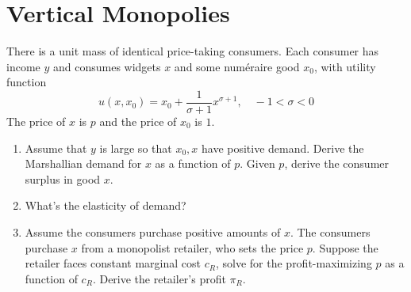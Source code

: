 \documentclass[11pt]{article}
\begin{document}
\section{Vertical Monopolies}
There is a unit mass of identical price-taking consumers. Each consumer has income $y$ and consumes widgets $x$ and some num\'eraire good $x_0$, with utility function \[
u(x, x_0) = x_0 + \frac{1}{\sigma+1} x^{\sigma+1}, \quad -1 < \sigma < 0
\]
The price of $x$ is $p$ and the price of $x_0$ is $1$.
\begin{enumerate}
    \item Assume that $y$ is large so that $x_0, x$ have positive demand. Derive the Marshallian demand for $x$ as a function of $p$. Given $p$, derive the consumer surplus in good $x$.
        
    
    \item What's the elasticity of demand?
    \item 
    Assume the consumers purchase positive amounts of $x$.
    The consumers purchase $x$ from a monopolist retailer, who sets the price $p$. Suppose the retailer faces constant marginal cost $c_R$, solve for the profit-maximizing $p$ as a function of $c_R$. Derive the retailer's profit $\pi_R$. 
         

\end{enumerate}
\end{document}
